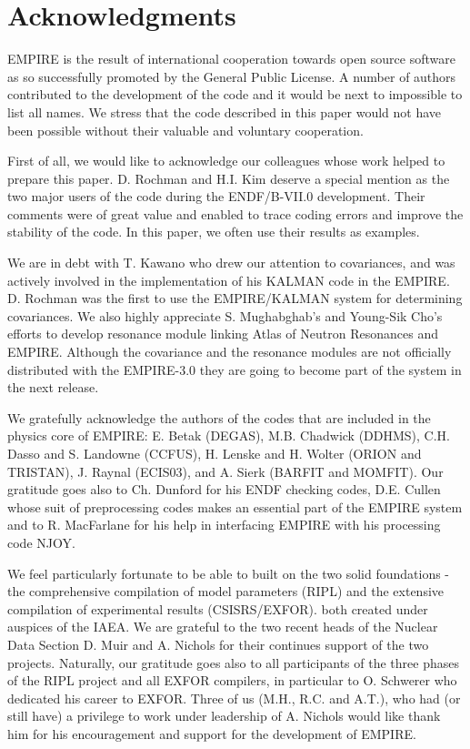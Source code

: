 \documentclass[twocolumn,amsmath,amssymb,10pt,groupedaddress,letter]{revtex4}
\begin{document}
\section*{Acknowledgments}

EMPIRE is the result of international cooperation towards open source software as so successfully promoted by the General Public License. A number of authors contributed to the development of the code and it would be next to impossible to list all names. We stress that the code described in this paper would not have been possible without their valuable and voluntary cooperation.

First of all, we would like to acknowledge our colleagues whose work helped to prepare this paper. D. Rochman and H.I. Kim deserve a special mention as the two major users of the code during the ENDF/B-VII.0 development. Their comments were of great value and enabled to trace coding errors and improve the stability of the code. In this paper, we often use their results as examples.

We are in debt with
T. Kawano who drew our attention to covariances, and was actively involved in the implementation of his KALMAN code in the EMPIRE. D. Rochman was the first to use the EMPIRE/KALMAN system for determining covariances. We also highly appreciate  S. Mughabghab's and Young-Sik Cho's efforts to develop resonance module linking Atlas of Neutron Resonances and EMPIRE. Although the covariance and the resonance modules are not officially distributed with the EMPIRE-3.0 they are going to become part of the system in the next release.

We gratefully acknowledge the authors of the codes that are included in the physics core of EMPIRE: E. Betak (DEGAS), M.B. Chadwick (DDHMS), C.H. Dasso and S. Landowne (CCFUS), H. Lenske and H. Wolter (ORION and TRISTAN), J. Raynal (ECIS03), and A. Sierk (BARFIT and MOMFIT). Our gratitude goes also to Ch. Dunford for his ENDF checking codes, D.E. Cullen whose suit of preprocessing codes makes an essential part of the EMPIRE system and to R. MacFarlane for his help in interfacing EMPIRE with his processing code NJOY.

We feel particularly fortunate to be able to built on the two solid foundations - the comprehensive compilation of model parameters (RIPL) and the extensive compilation of experimental results (CSISRS/EXFOR). both created under auspices of the IAEA.  We are grateful to the two recent heads of the Nuclear Data Section D. Muir and A. Nichols for their continues support of the two projects. Naturally, our gratitude goes also to all participants of the three phases of the RIPL project and all EXFOR compilers, in particular to O. Schwerer who dedicated his career to EXFOR. Three of us (M.H., R.C. and A.T.), who  had (or still have) a privilege to work under leadership of A. Nichols would like thank him for his encouragement and support for the development of EMPIRE.
\end{document}
